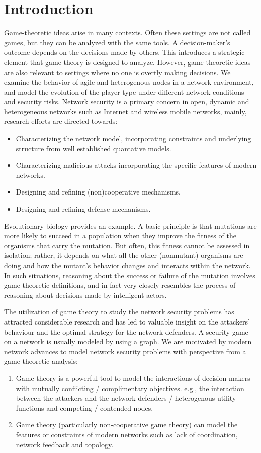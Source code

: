 \documentclass[10pt]{article}
\theoremstyle{definition}
\begin{document}
\section{Introduction}

Game-theoretic ideas arise in many contexts. Often these settings are not called games, but they 
can be analyzed with the same tools. A decision-maker’s outcome depends on the decisions made by others. This 
introduces a strategic element that game theory is designed to analyze. However, game-theoretic 
ideas are also relevant to settings where no one is overtly making decisions. We
examine the behavior of agile and heterogenous nodes in a network environment, and model the
evolution of the player type under different network conditions and security
risks. 
Network security is a primary concern in open, 
dynamic and heterogeneous networks such as Internet and wireless mobile networks, 
mainly, research efforts are directed towards:
\begin{itemize}
    \item Characterizing the network model, incorporating constraints and
    underlying structure from well established quantative models.
	\item Characterizing malicious attacks incorporating the specific features of modern networks.
	\item Designing and refining (non)cooperative mechanisms.
	\item Designing and refining defense mechanisms.
\end{itemize}
Evolutionary biology provides an example. A basic principle is that mutations are more likely 
to succeed in a population when they improve the fitness of the organisms that carry the mutation. 
But often, this fitness cannot be assessed in isolation; rather, it depends on what all the other 
(nonmutant) organisms are doing and how the mutant’s behavior changes and
interacts within the network. In such situations, reasoning about the success or failure of the mutation involves 
game-theoretic definitions, and in fact very closely resembles the process of reasoning about 
decisions made by intelligent actors. 

The utilization of game theory to study the network security problems has attracted considerable 
research and has led to valuable insight on the attackers’ behaviour and the optimal strategy for 
the network defenders. A security game on a network 
is usually modeled by using a graph. We are motivated by modern network advances
to model network security problems with perspective from a game theoretic
analysis:
\begin{enumerate}
	\item Game theory is a powerful tool to model the 
interactions of decision makers with mutually conflicting / complimentary objectives.
 e.g., the interaction between the attackers and the network defenders /
 heterogenous utility functions and competing / contended nodes.
	\item Game theory (particularly non-cooperative game theory) can model the
    features or constraints of modern networks such as lack of coordination,
    network feedback and topology.
\end{enumerate}
\end{document}
